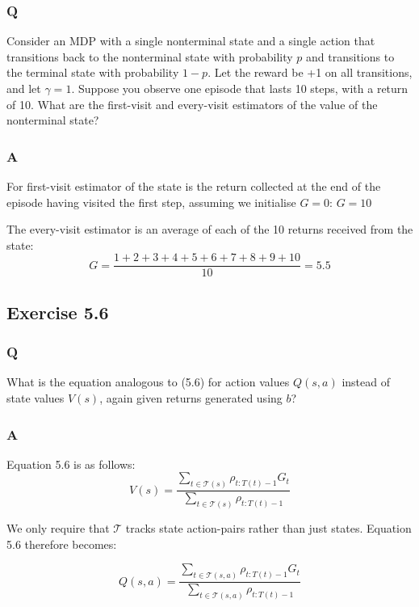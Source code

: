 \subsubsection{Q}
Consider an MDP with a single nonterminal state and a single action that transitions back to the nonterminal state with probability $p$ and transitions to the terminal state with probability $1 - p$. Let the reward be +1 on all transitions, and let $\gamma = 1$. Suppose you observe one episode that lasts 10 steps, with a return of 10. What are the first-visit and every-visit estimators of the value of the nonterminal state?
\subsubsection{A}
For first-visit estimator of the state is the return collected at the end of the episode having visited the first step, assuming we initialise $G=0$:
$
G = 10
$

The every-visit estimator is an average of each of the 10 returns received from the state:
\begin{equation}
G = \frac{1+2+3+4+5+6+7+8+9+10}{10} = 5.5
\end{equation}

\subsection*{Exercise 5.6}
\subsubsection{Q}
What is the equation analogous to (5.6) for action values $Q(s,a)$ instead of state values $V(s)$, again given returns generated using $b$?
\subsubsection{A}
Equation 5.6 is as follows:
\begin{equation}
V(s) = \frac{\sum_{t \in \mathcal{T}(s)} \rho_{t:T(t)-1} G_t}{\sum_{t \in \mathcal{T}(s)} \rho_{t:T(t)-1}}
\end{equation}

We only require that $\mathcal{T}$ tracks state action-pairs rather than just states. Equation 5.6 therefore becomes: 

\begin{equation}
Q(s,a) = \frac{\sum_{t \in \mathcal{T}(s,a)} \rho_{t:T(t)-1} G_t}{\sum_{t \in \mathcal{T}(s,a)} \rho_{t:T(t)-1}}
\end{equation}

